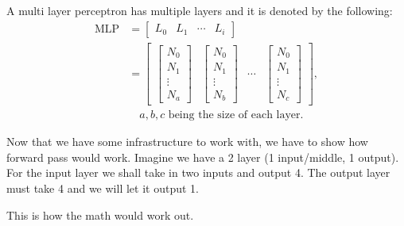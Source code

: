 \begin{definition}[MLP]
    A multi layer perceptron has multiple layers and it is denoted by the following:
    \begin{align*}
         \text{MLP} &= 
        \begin{bmatrix}
            L_0 & L_1 & \cdots & L_i
        \end{bmatrix} \\
        &=
        \begin{bmatrix}
           \begin{bmatrix}
                N_0 \\
                N_1 \\
                \vdots \\
                N_a    
          \end{bmatrix} 
          &
          \begin{bmatrix}
                N_0 \\
                N_1 \\
                \vdots \\
                N_b    
          \end{bmatrix}
          &
          \cdots
          & 
          \begin{bmatrix}
                N_0 \\
                N_1 \\
                \vdots \\
                N_c    
          \end{bmatrix}
        \end{bmatrix}, \\
        & \quad a,b,c \text{ being the size of each layer.}
    \end{align*}
\end{definition}

Now that we have some infrastructure to work with, we have to show how 
forward pass would work. Imagine we have a 2 layer (1 input/middle, 1 output). 
For the input layer we shall take in two inputs and output 4. The output layer must take 
4 and we will let it output 1.
    
This is how the math would work out.

